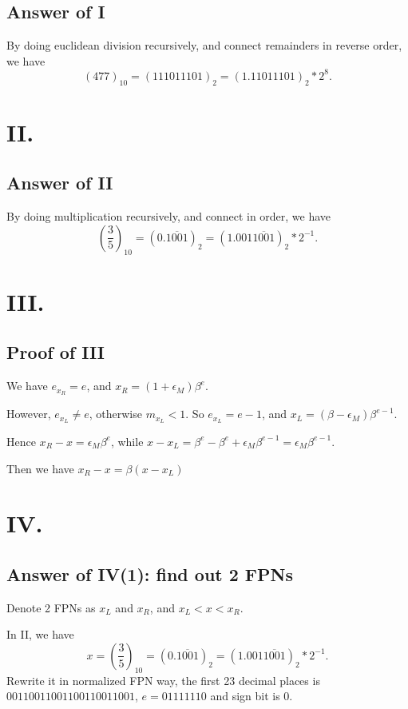 \documentclass[a4paper]{article}
\begin{document}
\subsection*{Answer of I}
By doing euclidean division recursively, and connect remainders in reverse order, we have
$$(477)_{10}=(111011101)_2=(1.11011101)_2*2^8.$$

\section*{II.}

\subsection*{Answer of II}
By doing multiplication recursively, and connect in order, we have
$$(\frac{3}{5})_{10}=(0.\overline{1001})_2=(1.001\overline{1001})_2*2^{-1}.$$

\section*{III.}

\subsection*{Proof of III}
We have $e_{x_R}=e$, and $x_R=(1+\epsilon_M)\beta^e$.

However, $e_{x_L} \neq e$, otherwise $m_{x_L}<1$. 
So $e_{x_L} = e-1$, and $x_L=(\beta-\epsilon_M)\beta^{e-1}$.

Hence $x_R-x=\epsilon_M\beta^e$, while $x-x_L=\beta^e-\beta^e+\epsilon_M\beta^{e-1}=\epsilon_M\beta^{e-1}$.

Then we have $x_R-x=\beta(x-x_L)$

\section*{IV.}

\subsection*{Answer of IV(1): find out 2 FPNs}
Denote 2 FPNs as $x_L$ and $x_R$, and $x_L<x<x_R$.

In II, we have $$x=(\frac{3}{5})_{10}=(0.\overline{1001})_2=(1.001\overline{1001})_2*2^{-1}.$$
Rewrite it in normalized FPN way, the first 23 decimal places is $00110011001100110011001$, $e=01111110$ and sign bit is 0.
\end{document}
